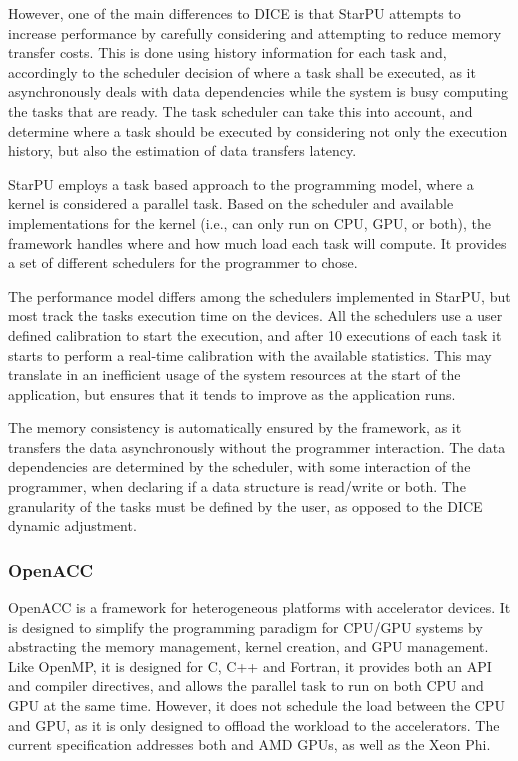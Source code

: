 However, one of the main differences to DICE is that StarPU attempts to increase performance by carefully considering and attempting to reduce memory transfer costs. This is done using history information for each task and, accordingly to the scheduler decision of where a task shall be executed, as it asynchronously deals with data dependencies while the system is busy computing the tasks that are ready. The task scheduler can take this into account, and determine where a task should be executed by considering not only the execution history, but also the estimation of data transfers latency.

StarPU employs a task based approach to the programming model, where a kernel is considered a parallel task. Based on the scheduler and available implementations for the kernel (i.e., can only run on CPU, GPU, or both), the framework handles where and how much load each task will compute. It provides a set of different schedulers for the programmer to chose.

The performance model differs among the schedulers implemented in StarPU, but most track the tasks execution time on the devices. All the schedulers use a user defined calibration to start the execution, and after 10 executions of each task it starts to perform a real-time calibration with the available statistics. This may translate in an inefficient usage of the system resources at the start of the application, but ensures that it tends to improve as the application runs.

The memory consistency is automatically ensured by the framework, as it transfers the data asynchronously without the programmer interaction. The data dependencies are determined by the scheduler, with some interaction of the programmer, when declaring if a data structure is read/write or both. The granularity of the tasks must be defined by the user, as opposed to the DICE dynamic adjustment.

\subsubsection*{OpenACC}

OpenACC \cite{OpenACC} is a framework for heterogeneous platforms with accelerator devices. It is designed to simplify the programming paradigm for CPU/GPU systems by abstracting the memory management, kernel creation, and GPU management. Like OpenMP, it is designed for C, C++ and Fortran, it provides both an API and compiler directives, and allows the parallel task to run on both CPU and GPU at the same time. However, it does not schedule the load between the CPU and GPU, as it is only designed to offload the workload to the accelerators. The current specification addresses both \nvidia and AMD GPUs, as well as the \intel Xeon Phi.

